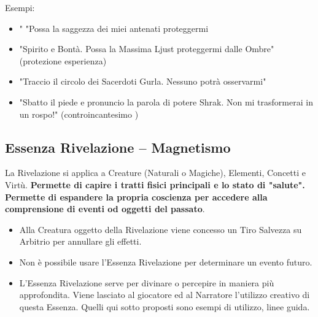 \documentclass[a4paper,11pt,twoside,openany]{book}
\begin{document}
\bigskip


Esempi:
\begin{itemize}
\item "
"Possa la saggezza dei miei antenati proteggermi 
\item 
"Spirito e Bontà. Possa la Massima Ljust proteggermi dalle Ombre" (protezione esperienza) 
\item 
"Traccio il circolo dei Sacerdoti Gurla. Nessuno potrà osservarmi" 
\item 
"Sbatto il piede e pronuncio la parola di potere Shrak. Non mi trasformerai in un rospo!" (controincantesimo )
\end{itemize}

\pagebreak

\subsection{Essenza Rivelazione -- Magnetismo}

\label{essenza-rivelazione---magnetismo}

La Rivelazione si applica a Creature (Naturali o Magiche), Elementi, Concetti e Virtù. \textbf{Permette di capire i tratti fisici principali e lo stato di "salute". Permette di espandere la propria coscienza per accedere alla comprensione di eventi od oggetti del passato}.
\begin{itemize}
\item 
Alla Creatura oggetto della Rivelazione viene concesso un Tiro Salvezza
su Arbitrio per annullare gli effetti. 
\item 
Non è possibile usare l'Essenza Rivelazione per determinare un evento futuro. 
\item 
L'Essenza Rivelazione serve per divinare o percepire in maniera più approfondita. Viene lasciato al giocatore ed al Narratore l'utilizzo creativo di questa Essenza. Quelli qui sotto proposti sono esempi di utilizzo, linee guida. 
\end{itemize}

\bigskip
\end{document}
